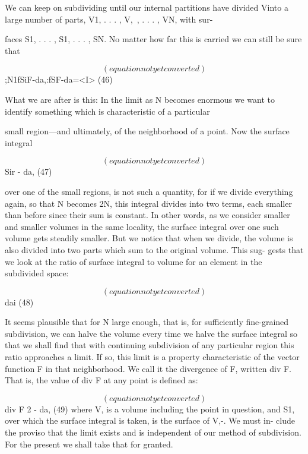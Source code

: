 We can keep on subdividing until our internal partitions have
divided Vinto a large number of parts, V1, . . . , V,~, . . . , VN, with sur-

faces S1, . . . , S1, . . . , SN. No matter how far this is carried we can
still be sure that

\begin{equation}
(equation not yet converted)
\end{equation}
;N1fSiF-da,:fSF-da=<I> (46)

What we are after is this: In the limit as N becomes enormous we
want to identify something which is characteristic of a particular

small region---and ultimately, of the neighborhood of a point. Now
the surface integral

\begin{equation}
(equation not yet converted)
\end{equation}
Sir - da, (47)

over one of the small regions, is not such a quantity, for if we divide
everything again, so that N becomes 2N, this integral divides into two
terms, each smaller than before since their sum is constant. In other
words, as we consider smaller and smaller volumes in the same
locality, the surface integral over one such volume gets steadily
smaller. But we notice that when we divide, the volume is also
divided into two parts which sum to the original volume. This sug-
gests that we look at the ratio of surface integral to volume for an
element in the subdivided space:

\begin{equation}
(equation not yet converted)
\end{equation}
 dai (48)

It seems plausible that for N large enough, that is, for sufficiently
fine-grained subdivision, we can halve the volume every time we
halve the surface integral so that we shall find that with continuing
subdivision of any particular region this ratio approaches a limit. If
so, this limit is a property characteristic of the vector function F in
that neighborhood. We call it the divergence of F, written div F.
That is, the value of div F at any point is defined as:

\begin{equation}
(equation not yet converted)
\end{equation}
div F 2  - da, (49)
where V, is a volume including the point in question, and S1, over
which the surface integral is taken, is the surface of V,-. We must in-
clude the proviso that the limit exists and is independent of our
method of subdivision. For the present we shall take that for
granted.

